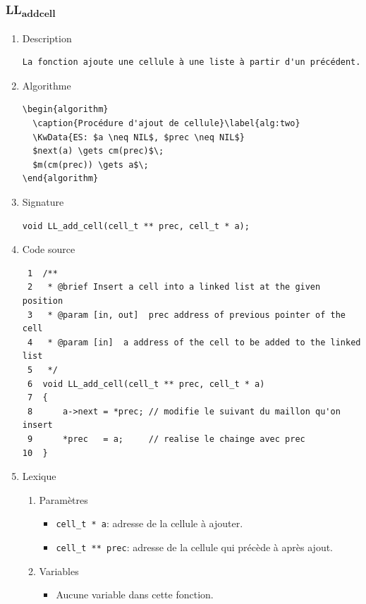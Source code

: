\documentclass[11pt]{article}
\begin{document}
\subsubsection{LL\textsubscript{add}\textsubscript{cell}}
\label{sec:org209b626}
\begin{enumerate}
\item Description
\label{sec:orgbb1c06b}

\begin{verbatim}
La fonction ajoute une cellule à une liste à partir d'un précédent.
\end{verbatim}

\item Algorithme
\label{sec:orge0e2493}

\begin{verbatim}
\begin{algorithm}
  \caption{Procédure d'ajout de cellule}\label{alg:two}
  \KwData{ES: $a \neq NIL$, $prec \neq NIL$}
  $next(a) \gets cm(prec)$\;
  $m(cm(prec)) \gets a$\;
\end{algorithm}
\end{verbatim}

\item Signature
\label{sec:org48525ad}

\begin{verbatim}
void LL_add_cell(cell_t ** prec, cell_t * a);
\end{verbatim}

\item Code source
\label{sec:org0ff1792}

\begin{verbatim}
 1  /**
 2   * @brief Insert a cell into a linked list at the given position
 3   * @param [in, out]  prec address of previous pointer of the cell
 4   * @param [in]  a address of the cell to be added to the linked list
 5   */
 6  void LL_add_cell(cell_t ** prec, cell_t * a)
 7  {
 8      a->next = *prec; // modifie le suivant du maillon qu'on insert
 9      *prec   = a;     // realise le chainge avec prec
10  }
\end{verbatim}

\item Lexique
\label{sec:orgb036e97}
\begin{enumerate}
\item Paramètres
\label{sec:org774751e}
\begin{itemize}
\item \texttt{cell\_t * a}: adresse de la cellule à ajouter.
\item \texttt{cell\_t ** prec}: adresse de la cellule qui précède à après ajout.
\end{itemize}
\item Variables
\label{sec:orgdcb2bcc}
\begin{itemize}
\item Aucune variable dans cette fonction.
\end{itemize}
\end{enumerate}


\end{enumerate}
\end{document}
